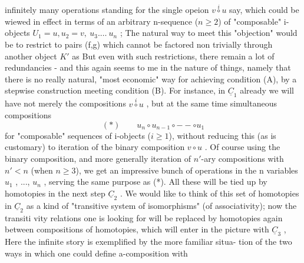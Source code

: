 infinitely many operations standing for the single opeion $v\overset{i}{\circ}u$ say,
which could be wiewed in effect in terms of an arbitrary n-sequence
($n\geqslant 2$) of "composable" i-objects $U_1=u,u_2=v,\ u_3.\dots\ u_n$ ; The natural
way to meet this "objection" would be to restrict to  pairs (f,g)
which cannot be factored non trivially through another object $K'$ as
But even with such restrictions, there remain a lot of redundancies
- and this again seems to me in the nature of things, namely that there
is no really natural, "most economic" way for achieving condition (A),
by a stepwise construction meeting condition (B). For instance, in $\underline{C}_1$
already we will have  not merely the compositions $v\overset{i}{\circ}u$ , but at the
same time simultaneous compositions
\[ (*) \qquad u_n\circ u_{n-1}\circ - - \circ u_1 \]
for "composable" sequences of i-objects ($i\geqslant 1$), without reducing this
(as is customary) to iteration of the binary composition $v\circ u$ . Of course
using the binary composition, and more generally iteration of $n'$-ary
compositions with $n'<n$ (when $n\geqslant 3$), we get an impressive bunch of
operations in the n variables $u_1$ , ..., $u_n$ , serving the same purpose
as (*). All these will be tied up by homotopies in the next step $\underline{C}_2$ .
We would like to think of this set of homotopies in $\underline{C}_2$ as a kind of
"transitive system of isomorphisms" (of associativity); now the transiti%
vity relations one is looking for will be replaced by homotopies again
between compositions of homotopies, which will enter in the picture with
$\underline{C}_3$ , Here the infinite story is exemplified by the more familiar situa-%
\margin{$\otimes$} tion of the two ways in which one could define a\hand{$\otimes$}-composition with
